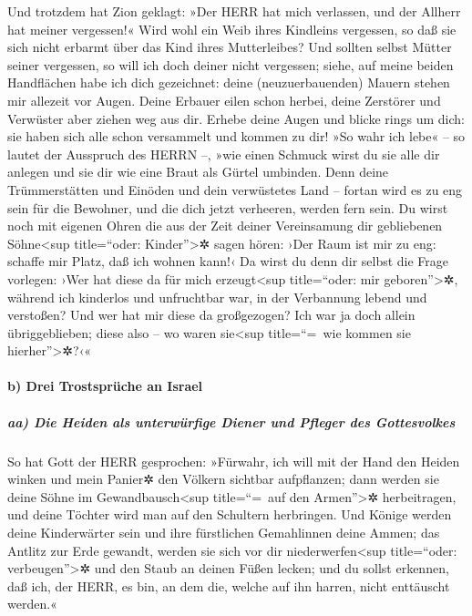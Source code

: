 Und trotzdem hat Zion geklagt: »Der HERR hat mich
verlassen, und der Allherr hat meiner vergessen!« Wird
wohl ein Weib ihres Kindleins vergessen, so daß sie sich nicht erbarmt
über das Kind ihres Mutterleibes? Und sollten selbst Mütter seiner
vergessen, so will ich doch deiner nicht vergessen;
siehe, auf meine beiden Handflächen habe ich dich
gezeichnet: deine (neuzuerbauenden) Mauern stehen mir allezeit vor
Augen. Deine Erbauer eilen schon herbei, deine Zerstörer
und Verwüster aber ziehen weg aus dir. Erhebe deine Augen
und blicke rings um dich: sie haben sich alle schon versammelt und
kommen zu dir! »So wahr ich lebe« -- so lautet der Ausspruch des HERRN
--, »wie einen Schmuck wirst du sie alle dir anlegen und sie dir wie
eine Braut als Gürtel umbinden. Denn deine Trümmerstätten
und Einöden und dein verwüstetes Land -- fortan wird es zu eng sein für
die Bewohner, und die dich jetzt verheeren, werden fern sein.
Du wirst noch mit eigenen Ohren die aus der Zeit deiner
Vereinsamung dir gebliebenen Söhne\textless sup title=``oder:
Kinder''\textgreater✲ sagen hören: ›Der Raum ist mir zu eng: schaffe mir
Platz, daß ich wohnen kann!‹ Da wirst du denn dir selbst
die Frage vorlegen: ›Wer hat diese da für mich erzeugt\textless sup
title=``oder: mir geboren''\textgreater✲, während ich kinderlos und
unfruchtbar war, in der Verbannung lebend und verstoßen? Und wer hat mir
diese da großgezogen? Ich war ja doch allein übriggeblieben; diese also
-- wo waren sie\textless sup title=``=~wie kommen sie
hierher''\textgreater✲?‹«

\hypertarget{b-drei-trostspruxfcche-an-israel}{%
\paragraph{b) Drei Trostsprüche an
Israel}\label{b-drei-trostspruxfcche-an-israel}}

\hypertarget{aa-die-heiden-als-unterwuxfcrfige-diener-und-pfleger-des-gottesvolkes}{%
\subparagraph{aa) Die Heiden als unterwürfige Diener und Pfleger des
Gottesvolkes}\label{aa-die-heiden-als-unterwuxfcrfige-diener-und-pfleger-des-gottesvolkes}}

So hat Gott der HERR gesprochen: »Fürwahr, ich will mit
der Hand den Heiden winken und mein Panier✲ den Völkern sichtbar
aufpflanzen; dann werden sie deine Söhne im Gewandbausch\textless sup
title=``=~auf den Armen''\textgreater✲ herbeitragen, und deine Töchter
wird man auf den Schultern herbringen. Und Könige werden
deine Kinderwärter sein und ihre fürstlichen Gemahlinnen deine Ammen;
das Antlitz zur Erde gewandt, werden sie sich vor dir
niederwerfen\textless sup title=``oder: verbeugen''\textgreater✲ und den
Staub an deinen Füßen lecken; und du sollst erkennen, daß ich, der HERR,
es bin, an dem die, welche auf ihn harren, nicht enttäuscht werden.«

